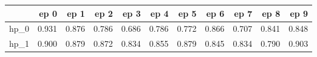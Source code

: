 \begin{tabular}{lrrrrrrrrrr}
\toprule
{} &   ep 0 &   ep 1 &   ep 2 &   ep 3 &   ep 4 &   ep 5 &   ep 6 &   ep 7 &   ep 8 &   ep 9 \\
\midrule
hp\_0 &  0.931 &  0.876 &  0.786 &  0.686 &  0.786 &  0.772 &  0.866 &  0.707 &  0.841 &  0.848 \\
hp\_1 &  0.900 &  0.879 &  0.872 &  0.834 &  0.855 &  0.879 &  0.845 &  0.834 &  0.790 &  0.903 \\
\bottomrule
\end{tabular}
